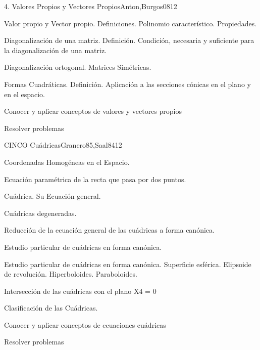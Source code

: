\begin{syllabus}
\begin{unit}{4. Valores Propios y Vectores Propios}{Anton,Burgos08}{12}
\begin{topics}
      \item Valor propio y Vector propio. Definiciones. Polinomio característico. Propiedades.
      \item Diagonalización de una matriz. Definición. Condición, necesaria y suficiente para la diagonalización de una matriz.
      \item Diagonalización ortogonal. Matrices Simétricas.
	\item Formas Cuadráticas. Definición. Aplicación a las secciones cónicas en el plano y en el espacio.
	\end{topics}

   \begin{learningoutcomes}
      \item Conocer y aplicar conceptos de valores y vectores propios
	\item Resolver problemas
   \end{learningoutcomes}
\end{unit}

\begin{unit}{CINCO Cuádricas}{Granero85,Saal84}{12}
\begin{topics}
      \item Coordenadas Homogéneas en el Espacio.
	\item Ecuación paramétrica de la recta que pasa por dos puntos.
	\item Cuádrica. Su Ecuación general.
	\item Cuádricas degeneradas.
	\item Reducción de la ecuación general de las cuádricas a forma canónica.
	\item Estudio particular de cuádricas en forma canónica.
	\item Estudio particular de cuádricas en forma canónica. Superficie esférica. Elipsoide de revolución. Hiperboloides. Paraboloides.
	\item Intersección de las cuádricas con el plano X4 = 0
	\item Clasificación de las Cuádricas.
   \end{topics}

   \begin{learningoutcomes}
      \item Conocer y aplicar conceptos de ecuaciones cuádricas
	\item Resolver problemas
   \end{learningoutcomes}
\end{unit}

\begin{coursebibliography}
\end{coursebibliography}
\end{syllabus}
